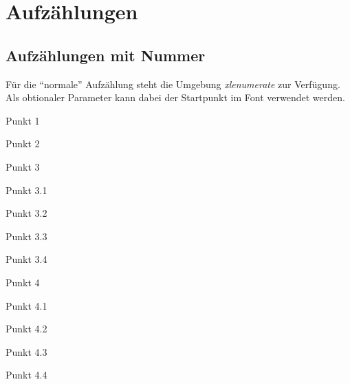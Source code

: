 \documentclass{fontdokuold}
\begin{document}
\begin{minipage}{\linewidth}
\begin{minipage}{.45\linewidth}
\Large
{}
\end{minipage}\hfill
\begin{minipage}{.45\linewidth}
\Large
{}
\end{minipage}
\end{minipage}



\section{Aufzählungen}
\subsection{Aufzählungen mit Nummer}

Für die "`normale"' Aufzählung steht die Umgebung \emph{xlenumerate} zur Verfügung.
Als obtionaler Parameter kann dabei der Startpunkt im Font verwendet werden.


\begin{xlenumerate}
\item Punkt 1
\item Punkt 2
\item Punkt 3
\begin{xlenumerate}[22]
\item Punkt 3.1
\item Punkt 3.2
\item Punkt 3.3
\item Punkt 3.4
\end{xlenumerate}
\item Punkt 4
\begin{xlenumerate}[124]
\item Punkt 4.1
\item Punkt 4.2
\item Punkt 4.3
\item Punkt 4.4
\end{xlenumerate}
\end{xlenumerate}
\end{document}
